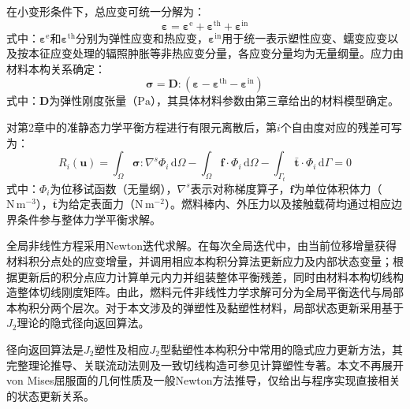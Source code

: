 在小变形条件下，总应变可统一分解为：
\begin{equation}
	\boldsymbol{\varepsilon}
	=
	\boldsymbol{\varepsilon}^{\mathrm{e}}
	+
	\boldsymbol{\varepsilon}^{\mathrm{th}}
	+
	\boldsymbol{\varepsilon}^{\mathrm{in}}
	\label{eq:ch4_strain_decomposition}
\end{equation}
\noindent 式中：$\boldsymbol{\varepsilon}^{\mathrm{e}}$和$\boldsymbol{\varepsilon}^{\mathrm{th}}$分别为弹性应变和热应变，$\boldsymbol{\varepsilon}^{\mathrm{in}}$用于统一表示塑性应变、蠕变应变以及按本征应变处理的辐照肿胀等非热应变分量，各应变分量均为无量纲量。应力由材料本构关系确定：
\begin{equation}
	\boldsymbol{\sigma}
	=
	\mathbf{D}:
	\left(
	\boldsymbol{\varepsilon}
	-\boldsymbol{\varepsilon}^{\mathrm{th}}
	-\boldsymbol{\varepsilon}^{\mathrm{in}}
	\right)
	\label{eq:ch4_constitutive_relation}
\end{equation}
\noindent 式中：$\mathbf{D}$为弹性刚度张量（$\mathrm{Pa}$），其具体材料参数由第三章给出的材料模型确定。

对第2章中的准静态力学平衡方程进行有限元离散后，第$i$个自由度对应的残差可写为：
\begin{equation}
	R_i(\mathbf{u})
	=
	\int_{\Omega}
	\boldsymbol{\sigma}:\nabla^{s}\boldsymbol{\varPhi}_i
	\,\mathrm{d}\Omega
	-
	\int_{\Omega}
	\mathbf{f}\cdot\boldsymbol{\varPhi}_i
	\,\mathrm{d}\Omega
	-
	\int_{\Gamma_t}
	\bar{\mathbf{t}}\cdot\boldsymbol{\varPhi}_i
	\,\mathrm{d}\Gamma
	=0
	\label{eq:ch4_mechanical_residual}
\end{equation}
\noindent 式中：$\boldsymbol{\varPhi}_i$为位移试函数（无量纲），$\nabla^{s}$表示对称梯度算子，$\mathbf{f}$为单位体积体力（$\mathrm{N\,m^{-3}}$），$\bar{\mathbf{t}}$为给定表面力（$\mathrm{N\,m^{-2}}$）。燃料棒内、外压力以及接触载荷均通过相应边界条件参与整体力学平衡求解。

全局非线性方程采用Newton迭代求解。在每次全局迭代中，由当前位移增量获得材料积分点处的应变增量，并调用相应本构积分算法更新应力及内部状态变量；根据更新后的积分点应力计算单元内力并组装整体平衡残差，同时由材料本构切线构造整体切线刚度矩阵。由此，燃料元件非线性力学求解可分为全局平衡迭代与局部本构积分两个层次。对于本文涉及的弹塑性及黏塑性材料，局部状态更新采用基于$J_2$理论的隐式径向返回算法。


径向返回算法是$J_2$塑性及相应$J_2$型黏塑性本构积分中常用的隐式应力更新方法，其完整理论推导、关联流动法则及一致切线构造可参见计算塑性专著\cite{dunneIntroductionComputationalPlasticity2005}。本文不再展开von Mises屈服面的几何性质及一般Newton方法推导，仅给出与程序实现直接相关的状态更新关系。

